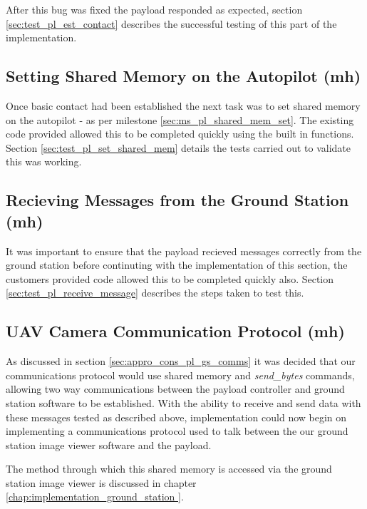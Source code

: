 After this bug was fixed the payload responded as expected, 
section \ref{sec:test_pl_est_contact} describes the successful testing of this part of
the implementation.

\subsection{Setting Shared Memory on the Autopilot (mh)}
Once basic contact had been established the next task was to set shared memory on
the autopilot - as per milestone \ref{sec:ms_pl_shared_mem_set}. The existing code
provided allowed this to be completed quickly using the built in functions. Section 
\ref{sec:test_pl_set_shared_mem} details the tests carried out to validate this
was working.

\subsection{Recieving Messages from the Ground Station (mh)}
It was important to ensure that the payload recieved messages correctly from the ground
station before continuting with the implementation of this section, the customers provided code
allowed this to be completed quickly also. Section \ref{sec:test_pl_receive_message} describes 
the steps taken to test this.

\subsection{UAV Camera Communication Protocol (mh)}
As discussed in section \ref{sec:appro_cons_pl_gs_comms} it was decided that 
our communications protocol would use shared memory and \emph{send\_bytes} 
commands, allowing two way communications between the payload controller and 
ground station software to be established. With the ability to receive and send data
with these messages tested as described above, implementation could now begin on
implementing a communications protocol used to talk between the our ground station 
image viewer software and the payload.

The method through which this shared memory is accessed via the ground station
image viewer is discussed in chapter \ref{chap:implementation_ground_station }.


